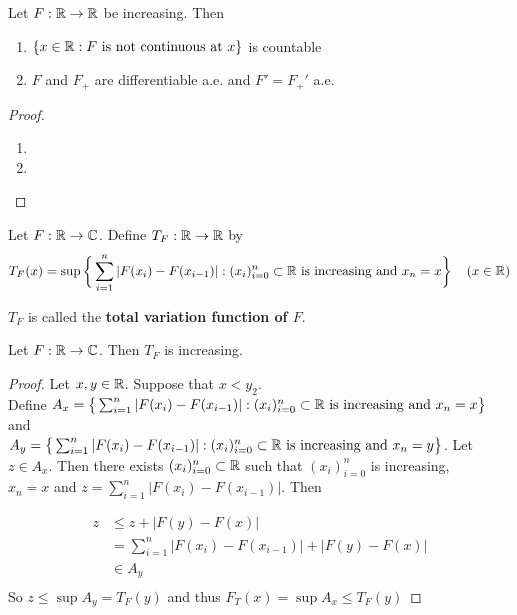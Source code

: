 \documentclass{book}
\begin{document}
	\begin{ex}
		Let $F:\mathbb{R} \rightarrow \mathbb{R}$ be increasing. Then 
		\begin{enumerate}
			\item $\{x \in \mathbb{R}: F \text{ is not continuous at }x\}$ is countable
			\item $F$ and $F_+$ are differentiable a.e. and $F' = F_+'$ a.e.
		\end{enumerate}
	\end{ex}

	\begin{proof}\
		\begin{enumerate}
			\item 
			\item 
		\end{enumerate}
	\end{proof}
	
	\begin{defn}  
		Let $F:\mathbb{R} \rightarrow \mathbb{C}$. Define $T_F:\mathbb{R} \rightarrow \mathbb{R}$ by $$T_F(x) = \sup\bigg \{\sum_{i=1}^{n}|F(x_{i}) - F(x_{i-1})|: (x_i)_{i=0}^n \subset \mathbb{R} \text{ is increasing and } x_n=x  \bigg \} \hspace{4mm} (x \in \mathbb{R})$$
		
		$T_F$ is called the \textbf{total variation function of $F$}.
	\end{defn}
	
	\begin{ex}  
		Let $F:\mathbb{R} \rightarrow \mathbb{C}$. Then $T_F$ is increasing.
	\end{ex}
	
	\begin{proof}
		Let $x,y \in \mathbb{R}$. Suppose that $x<y_2$. \\Define  $A_x = \big \{\sum_{i=1}^{n}|F(x_{i}) - F(x_{i-1})|: (x_i)_{i=0}^n \subset \mathbb{R} \text{ is increasing and } x_n=x  \big \}$ and \\$A_y = \big \{\sum_{i=1}^{n}|F(x_{i}) - F(x_{i-1})|: (x_i)_{i=0}^n \subset \mathbb{R} \text{ is increasing and } x_n=y  \big \}$. Let $z \in A_x$. Then there exists $(x_i)_{i=0}^n \subset \mathbb{R}$ such that $(x_i)_{i=0}^n$ is increasing,\\ $x_n=x$ and $z = \sum_{i=1}^n |F(x_{i}) - F(x_{i-1})|$. Then
		
		\begin{align*}
			z 
			& \leq z+|F(y)-F(x)|\\
			&= \sum_{i=1}^n |F(x_{i}) - F(x_{i-1})| + |F(y)-F(x)|\\
			& \in A_y\\
		\end{align*} 
		So $z \leq \sup A_y = T_F(y) $ and thus $F_T(x)  = \sup A_x \leq T_F(y)$
	\end{proof}
	
\end{document}
